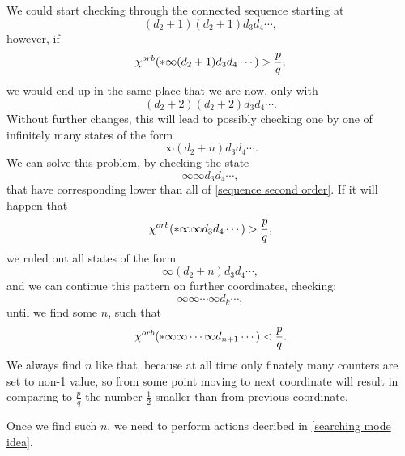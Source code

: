 We could start checking through the connected sequence starting at 
\begin{equation}
(d_2+1)(d_2+1)d_3d_4\cdots, 
\end{equation}
however, if 
\begin{equation}
{\chi^{orb}(*\infty(d_2+1)d_3d_4\cdots)} > \frac{p}{q}, 
\end{equation}
we would end up in the same place that we are now, only with 
\begin{equation}
(d_2+2)(d_2+2)d_3d_4\cdots.
\end{equation}
Without further changes, this will lead to possibly checking one by one of infinitely many states 
of the form 
\begin{equation}\label{sequence second order}
\infty(d_2+n)d_3d_4\cdots. 
\end{equation}
We can solve this problem, by checking the state 
\begin{equation}
\infty\infty d_3d_4\cdots, 
\end{equation}
that have corresponding \Eoc lower than all of \ref{sequence second order}. 
If it will happen that 
\begin{equation}
{\chi^{orb}(*\infty\infty d_3d_4\cdots)} > \frac{p}{q},
\end{equation}
we ruled out all states of the form
\begin{equation}
\infty(d_2+n)d_3d_4\cdots,
\end{equation}
and we can continue this pattern on further coordinates, checking: 
\begin{equation}
\infty\infty \cdots \infty d_k\cdots, 
\end{equation}
until we find some $n$, such that
\begin{equation}
{\chi^{orb}(*\infty\infty \cdots \infty d_{n+1}\cdots)} < \frac{p}{q}.
\end{equation}
We always find $n$ like that, because at all time only finately many counters are set 
to non-1 value, so from some point moving to next coordinate will result in 
comparing to $\frac{p}{q}$ the number $\frac{1}{2}$ smaller than from previous coordinate. 

Once we find such $n$, we need to perform actions decribed in \ref{searching mode idea}.  


